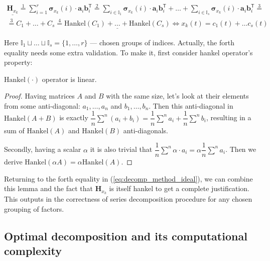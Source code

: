 	\begin{multline}\label{eq:decomp_method_ideal}
		\underline{\mathbf{H}_{x_k}} \overset{1}{=} \sum\limits_{i = 1}^{r} \boldsymbol{\sigma}_{x_k}(i) \cdot \mathbf{a}_i  \mathbf{b}_i^{\mathsf{T}} \overset{2}{=} \sum\limits_{i \in \mathbb{I}_1} \boldsymbol{\sigma}_{x_k}(i) \cdot \mathbf{a}_i  \mathbf{b}_i^{\mathsf{T}} + \ldots + \sum\limits_{i \in \mathbb{I}_s} \boldsymbol{\sigma}_{x_k}(i) \cdot \mathbf{a}_i  \mathbf{b}_i^{\mathsf{T}} \overset{3}{=} \\ \overset{3}{=} C_1 + \ldots + C_s \overset{4}{=} \underline{\text{Hankel}(C_1) + \ldots + \text{Hankel}(C_s)}  \Leftrightarrow x_k(t) = c_1(t) + \ldots c_s(t)
	\end{multline}
	
	Here $ \mathbb{I}_1 \sqcup \ldots \sqcup \mathbb{I}_s = \{1, \ldots, r\} $ --- chosen groups of indices. Actually, the forth equality needs some extra validation. To make it, first consider hankel operator's property:
	
	\begin{Lem}
		$ \text{Hankel}(\cdot) $ operator is linear.
	\end{Lem}
	
	\begin{proof}		
		Having matrices $ A $ and $ B $ with the same size, let's look at their elements from some anti-diagonal: $ a_1, \ldots, a_n $ and $ b_1, \ldots, b_n $. Then this anti-diagonal in $ \text{Hankel}(A + B) $ is exactly $ \dfrac{1}{n} \sum\limits^n (a_i + b_i) = \dfrac{1}{n} \sum\limits^n a_i + \dfrac{1}{n} \sum\limits^n b_i $, resulting in a sum of  $ \text{Hankel}(A) $ and $ \text{Hankel}(B) $ anti-diagonals.
		
		Secondly, having a scalar $ \alpha $ it is also trivial that $ \dfrac{1}{n} \sum\limits^n \alpha \cdot a_i = \alpha \dfrac{1}{n} \sum\limits^n a_i $. Then we derive $ \text{Hankel}(\alpha A) = \alpha \text{Hankel}(A) $.
	\end{proof}
	
	Returning to the forth equality in (\ref{eq:decomp_method_ideal}), we can combine this lemma and the fact that $ \mathbf{H}_{x_k} $ is itself hankel to get a complete justification. This outputs in the correctness of series decomposition procedure for any chosen grouping of factors.
	
	\subsection*{Optimal decomposition and its computational complexity}\label{sec:optimal_decomp}
	
